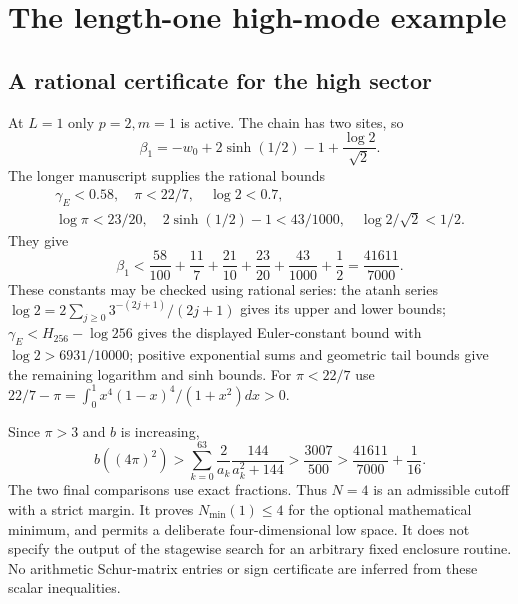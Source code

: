 \section{The length-one high-mode example}
\subsection{A rational certificate for the high sector}
At $L=1$ only $p=2,m=1$ is active. The chain has two sites, so
\[
\beta_1=-w_0+2\sinh(1/2)-1+\frac{\log2}{\sqrt2}.
\]
The longer manuscript supplies the rational bounds
\[
\begin{gathered}
\gamma_E<0.58,\quad\pi<22/7,\quad\log2<0.7,\\
\log\pi<23/20,\quad2\sinh(1/2)-1<43/1000,\quad
\log2/\sqrt2<1/2.
\end{gathered}
\]
They give
\[
\beta_1<\frac{58}{100}+\frac{11}{7}+\frac{21}{10}
+\frac{23}{20}+\frac{43}{1000}+\frac12=\frac{41611}{7000}.
\]
These constants may be checked using rational series: the atanh series
$\log2=2\sum_{j\ge0}3^{-(2j+1)}/(2j+1)$ gives its upper and lower bounds;
$\gamma_E<H_{256}-\log256$ gives the displayed Euler-constant bound
with $\log2>6931/10000$; positive exponential sums and geometric tail
bounds give the remaining logarithm and sinh bounds. For $\pi<22/7$ use
$22/7-\pi=\int_0^1x^4(1-x)^4/(1+x^2)dx>0$.

Since $\pi>3$ and $b$ is increasing,
\[
b((4\pi)^2)>\sum_{k=0}^{63}\frac2{a_k}\frac{144}{a_k^2+144}
>\frac{3007}{500}>\frac{41611}{7000}+\frac1{16}.
\]
The two final comparisons use exact fractions. Thus $N=4$ is an
admissible cutoff with a strict margin. It proves $N_{\min}(1)\le4$
for the optional mathematical minimum, and permits a deliberate
four-dimensional low space. It does not specify the output of the
stagewise search for an arbitrary fixed enclosure routine.
No arithmetic Schur-matrix entries or sign certificate are inferred
from these scalar inequalities.

